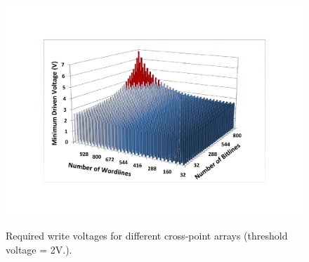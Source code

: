 \begin{figure}%
\centering
\hspace{-5pt}
  \includegraphics[width=2.6 in]{./figures/worst_v_f1.pdf}\\
  \caption{Required write voltages for different cross-point arrays (threshold voltage = 2V.). }\label{fig:worst_v}
  \vspace{-10pt}
\end{figure}

%







